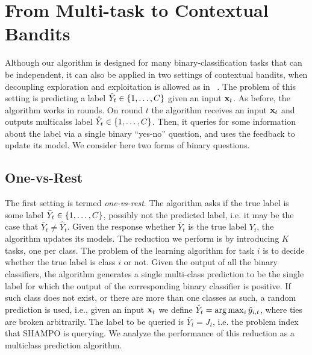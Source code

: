 \chapter{From Multi-task to Contextual Bandits}
Although our algorithm is designed for many binary-classification tasks that can be independent, 
it can also be applied in two settings of contextual bandits, when decoupling exploration and 
exploitation is allowed as in ~\cite{DBLP:conf/icml/YuM09,DBLP:conf/icml/AvnerMS12}. 
The problem of this setting is predicting a label $\hat{Y}_t \in\{ 1 , \ldots , C\}$ given an input $\mathbf{x}_{t}$. 
As before, the algorithm works in rounds. On round $t$ the algorithm receives an input $\mathbf{x}_{t}$ and 
outputs  multicalss label $\hat{Y}_t\in\{1 , \ldots , C\}$. 
Then, it queries for some information about the label via a single binary ``yes-no'' question, and uses the 
feedback to update its model. We consider here two forms of binary questions.



\section{One-vs-Rest}
The first setting is termed {\em one-vs-rest}. The algorithm asks if the true label is some label 
$\bar{Y}_t\in\{ 1 , \ldots , C\}$, possibly not the predicted label, i.e. it may be the case that 
$\bar{Y}_t \neq\hat{Y}_t$. Given the response whether  $\bar{Y}_t$ is the true label $Y_t$, the algorithm 
updates its models. The reduction we perform is by introducing $K$ tasks, one per class. 
The problem of the learning algorithm for task $i$ is to decide whether the true label is class $i$ or not. 
Given the output of all the binary classifiers, the algorithm generates a single multi-class prediction to be the 
single label for which the output of the corresponding binary classifier is positive. If such class does not 
exist, or there are more than one classes  as such, a random prediction is used, i.e., given an input $\mathbf{x}_{t}$ 
we define $\hat{Y}_t = \arg\max_i \hat{y}_{i,t}$, where ties are broken arbitrarily. The label to be queried is 
$\bar{Y}_t=J_t$, i.e. the problem index that SHAMPO is querying. We analyze the performance of this 
reduction as a multiclass prediction algorithm.

